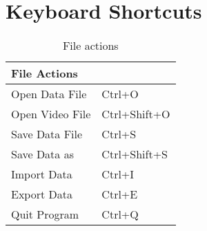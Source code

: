 \section{Keyboard Shortcuts}
   \begin{table}[H] 
      \caption{File actions}
      \label{fileactions} 

      \begin{tabular}{|l|l|}
         \hline
         File Actions	 &	\\
         \hline
         Open Data File	 &      Ctrl+O	\\
         Open Video File &      Ctrl+Shift+O	\\
         Save Data File	 &      Ctrl+S	\\
         Save Data as	 &      Ctrl+Shift+S	\\
         Import Data     &      Ctrl+I	\\
         Export Data	    &      Ctrl+E	\\
         Quit Program	 &      Ctrl+Q	\\
         \hline
      \end{tabular}
   \end{table}
\vspace*{1cm}
